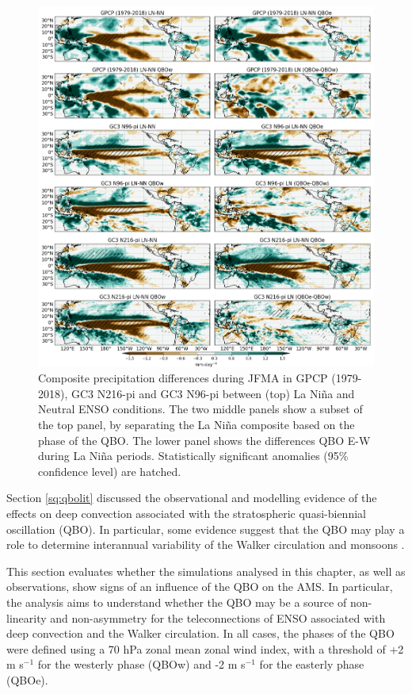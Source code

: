 \begin{figure}[b!]
\includegraphics[width=\linewidth]{figures/trops_qbolnprfma}
\caption[Precipitation anomalies as a function of QBO and ENSO phases]{Composite precipitation differences during JFMA in GPCP (1979-2018), GC3 N216-pi and GC3 N96-pi between (top) La Niña and Neutral ENSO conditions. The two middle panels show a subset of the top panel, by separating the La Niña composite based on the phase of the QBO. The lower panel shows the differences QBO E-W during La Niña periods. Statistically significant anomalies (95\% confidence level) are hatched.}
\label{fig:qbopr_pis}
\end{figure}  

Section \ref{sq:qbolit} discussed the observational and modelling evidence of the effects on deep convection associated with the stratospheric quasi-biennial oscillation (QBO). In particular, some evidence suggest that the QBO may play a role to determine interannual variability of the Walker circulation and monsoons \citep{giorgetta1999,collimore2003,liess2012}. 

This section evaluates whether the simulations analysed in this chapter, as well as observations, show signs of an influence of the QBO on the AMS. 
In particular, the analysis aims to understand whether the QBO may be a source of non-linearity and non-asymmetry for the teleconnections of ENSO associated with deep convection and the Walker circulation. In all cases, the phases of the QBO were defined using a 70 hPa zonal mean zonal wind index, with a threshold of +2 m s$^{-1}$ for the westerly phase (QBOw) and -2 m s$^{-1}$ for the easterly phase (QBOe).

